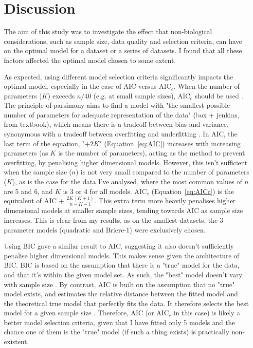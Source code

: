 \documentclass[11pt, a4paper]{article}
\begin{document}
\section{Discussion}

The aim of this study was to investigate the effect that non-biological considerations, such as sample size, data quality and selection criteria, can have on the optimal model for a dataset or a series of datasets. I found that all these factors affected the optimal model chosen to some extent.

As expected, using different model selection criteria significantly impacts the optimal model, especially in the case of AIC versus AIC$_c$. When the number of parameters ($K$) exceeds $n/40$ (e.g. at small sample sizes), AIC$_c$ should be used \cite{johnsonModelSelectionEcology2004}. The principle of parsimony aims to find a model with "the smallest possible number of parameters for adequate representation of the data" (box + jenkins, from textbook), which means there is a tradeoff between bias and variance, synonymous with a tradeoff between overfitting and underfitting \cite{ModelSelectionMultimodel}. In AIC, the last term of the equation, "$+2K$" (Equation~\ref{eq:AIC}) increases with increasing parameters (as $K$ is the number of parameters), acting as the method to prevent overfitting, by penalising higher dimensional models. However, this isn't sufficient when the sample size ($n$) is not very small compared to the number of parameters ($K$), as is the case for the data I've analysed, where the most common values of $n$ are 5 and 6, and $K$ is 3 or 4 for all models. AIC$_c$ (Equation~\ref{eq:AICc}) is the equivalent of AIC + $\frac{2K(K+1)}{n-K-1}$. This extra term more heavily penalises higher dimensional models at smaller sample sizes, tending towards AIC as sample size increases. This is clear from my results, as on the smallest datasets, the 3 parameter models (quadratic and Briere-1) were exclusively chosen.

Using BIC gave a similar result to AIC, suggesting it also doesn't sufficiently penalise higher dimensional models. This makes sense given the architecture of BIC. BIC is based on the assumption that there is a "true" model for the data, and that it's within the given model set. As such, the "best" model doesn't vary with sample size \cite{ModelSelectionMultimodel}. By contrast, AIC is built on the assumption that no "true" model exists, and estimates the relative distance between the fitted model and the theoretical true model that perfectly fits the data. It therefore selects the best model for a given sample size \cite{ModelSelectionMultimodel}. Therefore, AIC (or AIC$_c$ in this case) is likely a better model selection criteria, given that I have fitted only 5 models and the chance one of them is the "true" model (if such a thing exists) is practically non-existent.
\end{document}

